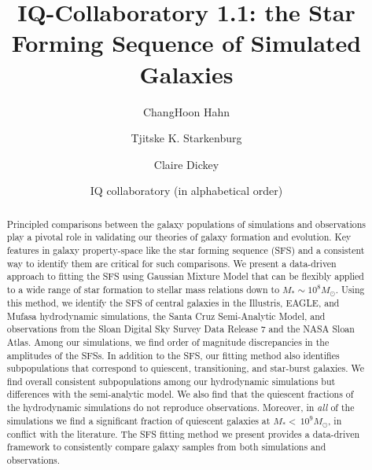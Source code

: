 \documentclass[preprint2,tighten]{aastex62}
\newcommand{\todo}[1]{{\bf \textcolor{red}{ #1}}}
\begin{document}
\title{IQ-Collaboratory 1.1: the Star Forming Sequence of Simulated Galaxies}
\author{ChangHoon Hahn}
\author{Tjitske K. Starkenburg}
\author{Claire Dickey}

\author{IQ collaboratory (in alphabetical order)}

\begin{abstract}
Principled comparisons between the galaxy populations of simulations and 
observations play a pivotal role in validating our theories of galaxy 
formation and evolution. %
Key features in galaxy property-space like the star forming sequence
(SFS) %
and a consistent way to identify them are critical for such comparisons. 
We present a data-driven approach to fitting the SFS using Gaussian 
Mixture Model that can be flexibly applied to a wide range of star 
formation to stellar mass relations down to $M_*{\sim}10^{8}M_\odot$. %
Using this method, we identify the SFS of central galaxies in 
the Illustris, EAGLE, and {\sc Mufasa} hydrodynamic simulations, the Santa Cruz 
Semi-Analytic Model, and observations from the Sloan Digital 
Sky Survey Data Release 7 and the NASA Sloan Atlas. Among our simulations, 
we find order of magnitude discrepancies in the amplitudes of the SFSs. 
In addition to the SFS, our fitting method also identifies subpopulations 
that correspond to quiescent, transitioning, and star-burst galaxies. 
We find overall consistent subpopulations among our hydrodynamic simulations 
but differences with the semi-analytic model. We also find that the quiescent 
fractions of the hydrodynamic simulations do not reproduce observations. 
Moreover, in \emph{all} of the simulations we find a significant fraction 
of quiescent galaxies at $M_*{<}\,10^9M_\odot$, in conflict with the literature. %
The SFS fitting method we present provides a data-driven framework to 
consistently compare galaxy samples from both simulations and observations. 
\end{abstract}
\end{document}
